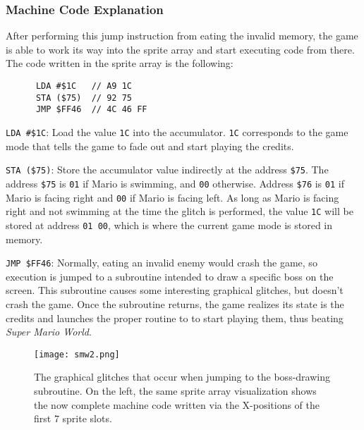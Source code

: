 \subsubsection{Machine Code Explanation}

After performing this jump instruction from eating the invalid memory, the game is able to work its way into the sprite array and start executing code from there. The code written in the sprite array is the following:

      \begin{lstlisting}
      LDA #$1C   // A9 1C
      STA ($75)  // 92 75
      JMP $FF46  // 4C 46 FF
      \end{lstlisting}

\texttt{LDA \#\$1C}: Load the value \texttt{1C} into the accumulator. \texttt{1C} corresponds to the game mode that tells the game to fade out and start playing the credits.

\texttt{STA (\$75)}: Store the accumulator value indirectly at the address \texttt{\$75}. The address \texttt{\$75} is \texttt{01} if Mario is swimming, and \texttt{00} otherwise. Address \texttt{\$76} is \texttt{01} if Mario is facing right and \texttt{00} if Mario is facing left. As long as Mario is facing right and not swimming at the time the glitch is performed, the value \texttt{1C} will be stored at address \texttt{01 00}, which is where the current game mode is stored in memory.

\texttt{JMP \$FF46}: Normally, eating an invalid enemy would crash the game, so execution is jumped to a subroutine intended to draw a specific boss on the screen. This subroutine causes some interesting graphical glitches, but doesn't crash the game. Once the subroutine returns, the game realizes its state is the credits and launches the proper routine to to start playing them, thus beating \textit{Super Mario World}.

\begin{figure}
\texttt{[image: smw2.png]}
\caption{The graphical glitches that occur when jumping to the boss-drawing subroutine. On the left, the same sprite array visualization shows the now complete machine code written via the X-positions of the first 7 sprite slots. \cite{dotsarecool_2015}}
\end{figure}
